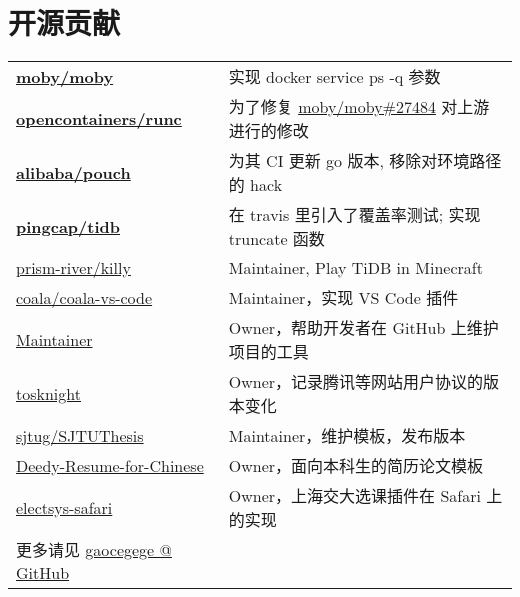 \documentclass[]{deedy-resume-openfont}
\begin{document}
\begin{minipage}[t]{0.68\textwidth}
\section{开源贡献}
\begin{tabular}{ll}
\href{https://github.com/moby/moby/commits?author=gaocegege}{\bf moby/moby} & 实现 docker service ps -q 参数 \\
\href{https://github.com/opencontainers/runc/commits?author=gaocegege}{\bf opencontainers/runc} & 为了修复 \href{https://github.com/moby/moby/issues/27484}{moby/moby\#27484} 对上游进行的修改 \\
\href{https://github.com/alibaba/pouch/commits?author=gaocegege}{\bf  alibaba/pouch} & 为其 CI 更新 go 版本, 移除对环境路径的 hack \\
\href{https://github.com/pingcap/tidb/commits?author=gaocegege}{\bf pingcap/tidb} & 在 travis 里引入了覆盖率测试; 实现 truncate 函数 \\
\href{https://github.com/prism-river/killy}{prism-river/killy} & Maintainer, Play TiDB in Minecraft \\
\href{https://github.com/coala/coala-vs-code/commits/master?author=gaocegege}{coala/coala-vs-code} & Maintainer，实现 VS Code 插件 \\
\href{https://github.com/gaocegege/maintainer}{Maintainer} & Owner，帮助开发者在 GitHub 上维护项目的工具 \\
\href{https://github.com/siglt/tosknight}{tosknight} & Owner，记录腾讯等网站用户协议的版本变化 \\
\href{https://github.com/sjtug/SJTUThesis/commits?author=gaocegege}{sjtug/SJTUThesis} & Maintainer，维护模板，发布版本 \\
\href{https://github.com/dyweb/Deedy-Resume-for-Chinese}{Deedy-Resume-for-Chinese} & Owner，面向本科生的简历论文模板 \\
\href{https://github.com/dyweb/electsys-safari}{electsys-safari} & Owner，上海交大选课插件在 Safari 上的实现 \\
更多请见 \href{https://github.com/gaocegege}{gaocegege @ GitHub} & \\
\end{tabular}
\sectionsep

\sectionsep\end{minipage}
\end{document}
